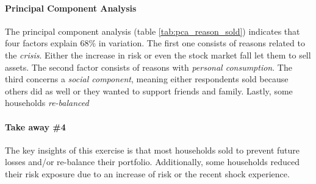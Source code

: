 \documentclass[ProjectABM]{subfiles}
\begin{document}
\paragraph{Principal Component Analysis}
The principal component analysis (table \ref{tab:pca_reason_sold}) indicates that four factors explain 68\% in variation. The first one consists of reasons related to the \textit{crisis}. Either the increase in risk or even the stock market fall let them to sell assets. The second factor consists of reasons with \textit{personal consumption}. The third concerns a \textit{social component}, meaning either respondents sold because others did as well or they wanted to support friends and family. Lastly, some households \textit{re-balanced}



\paragraph{Take away \#4}
The key insights of this exercise is that most households sold to prevent future losses and/or re-balance their portfolio. Additionally, some households reduced their risk exposure due to an increase of risk or the recent shock experience.



\end{document}
